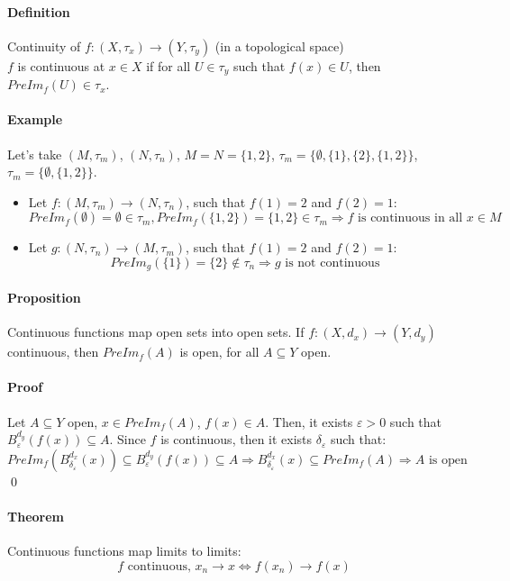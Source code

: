 \documentclass{article}
\newcommand{\func}[3]{#1 : #2 \rightarrow #3}
\newcommand{\Ep}{\varepsilon}
\newcommand{\Def}{\paragraph{Definition}}
\newcommand{\Proposition}{\paragraph{Proposition}}
\newcommand{\Theorem}{\paragraph{Theorem}}
\newcommand{\Proof}{\paragraph{Proof}}
\newcommand{\Example}{\paragraph{Example}}
\begin{document}
  \Def Continuity of $\func{f}{(X,\tau_x)}{(Y,\tau_y)}$ (in a topological space)
\\$f$ is continuous at $x \in X$ if for all $U \in \tau_y$ such that $f(x) \in
  U$, then $PreIm_f(U) \in \tau_x$.

  \Example Let's take $(M,\tau_m)$, $(N,\tau_n)$, $M = N = \{ 1, 2 \}$,
  $\tau_m = \{ \emptyset, \{ 1 \}, \{ 2 \}, \{ 1, 2 \} \}$, $\tau_m = \{
  \emptyset, \{ 1, 2 \} \}$.
  \begin{itemize}
    \item Let $\func{f}{(M,\tau_m)}{(N,\tau_n)}$, such that $f(1) = 2$ and $f(2)
    = 1$:
    \begin{equation*}
      PreIm_f(\emptyset) = \emptyset \in \tau_m,
      PreIm_f(\{ 1, 2 \}) = \{ 1, 2 \} \in \tau_m \Rightarrow
      f \text{ is continuous in all } x \in M
    \end{equation*}
    \item Let $\func{g}{(N,\tau_n)}{(M,\tau_m)}$, such that $f(1) = 2$ and $f(2)
    = 1$:
    \begin{equation*}
      PreIm_g(\{ 1 \}) = \{ 2 \} \notin \tau_n \Rightarrow
      g \text{ is not continuous}
    \end{equation*}
  \end{itemize}

  \Proposition Continuous functions map open sets into open sets. If
  $\func{f}{(X,d_x)}{(Y,d_y)}$ continuous, then $PreIm_f(A)$ is open, for all
  $A \subseteq Y$ open.

  \Proof Let $A \subseteq Y$ open, $x \in PreIm_f(A)$, $f(x) \in A$. Then, it
  exists $\Ep > 0$ such that $B_\Ep^{d_y}(f(x)) \subseteq A$. Since
  $f$ is continuous, then it exists $\delta_\Ep$ such that:
  \begin{equation*}
    PreIm_f(B_{\delta_\Ep}^{d_x}(x)) \subseteq B_\Ep^{d_y}(f(x))
    \subseteq A \Rightarrow B_{\delta_\Ep}^{d_x}(x) \subseteq PreIm_f(A)
    \Rightarrow A \text{ is open}
  \end{equation*}
  \qed

  \Theorem Continuous functions map limits to limits:
  \begin{equation*}
    f \text{ continuous, } x_n \to x \iff f(x_n) \to f(x)
  \end{equation*}
\end{document}
